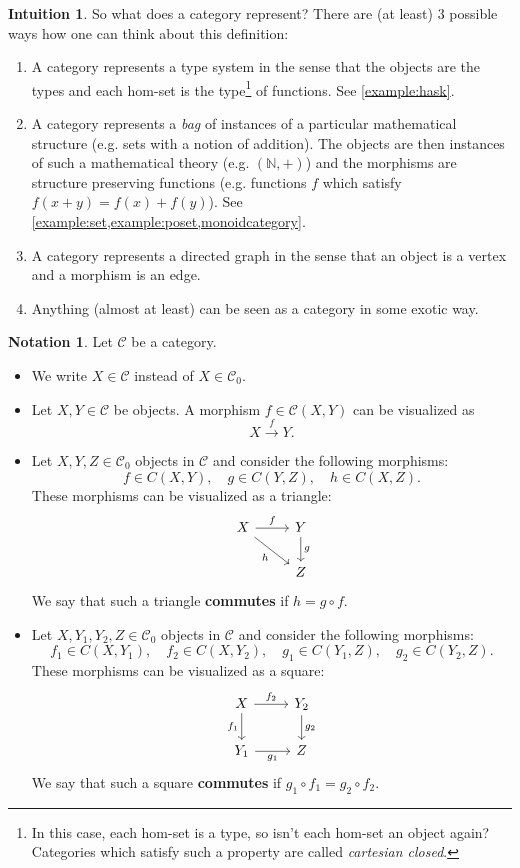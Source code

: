 \documentclass[a4paper,10pt]{scrartcl}
\theoremstyle{plain}
\theoremstyle{definition}
\newtheorem{intu}[thm]{Intuition}
\newtheorem{nota}[thm]{Notation}
\newcommand{\Cat}[1]{\mathcal{#1}}
\newcommand{\CC}{\Cat{C}}
\newcommand{\Ob}[1]{{#1}_0}
\newcommand{\CHom}[3]{{#1}(#2,#3)}
\newcommand{\co}[2]{\ensuremath{#2 \circ #1}}
\begin{document}
\begin{intu} So what does a category represent? There are (at least) $3$ possible ways how one can think about this definition:
\begin{enumerate}
\item A category represents a type system in the sense that the objects are the types and each hom-set is the type\footnote{In this case, each hom-set is a type, so isn't each hom-set an object again? Categories which satisfy such a property are called \textit{cartesian closed}.} of functions. See \cref{example:hask}.
\item A category represents a \textit{bag} of instances of a particular mathematical structure (e.g. sets with a notion of addition). The objects are then instances of such a mathematical theory (e.g. $(\mathbb{N},+)$) and the morphisms are structure preserving functions (e.g. functions $f$ which satisfy $f(x+y) = f(x) + f(y)$). See \cref{example:set,example:poset,monoidcategory}.
\item A category represents a directed graph in the sense that an object is a vertex and a morphism is an edge.
\item Anything (almost at least) can be seen as a category in some exotic way. 
\end{enumerate}
\end{intu}

\begin{nota} Let $\CC$ be a category.
\begin{itemize}
\item We write $X\in\CC$ instead of $X\in \Ob{\CC}$. 
\item Let $X,Y\in \CC$ be objects. A morphism $f\in\CHom{\CC}{X}{Y}$ can be visualized as \[ X \xrightarrow{f} Y. \]
\item Let $X,Y, Z \in \Ob{\CC}$ objects in $\CC$ and consider the following morphisms:
\[
f\in\CHom{C}{X}{Y}, \quad g\in\CHom{C}{Y}{Z}, \quad h\in\CHom{C}{X}{Z}.
\]
These morphisms can be visualized as a triangle:
\[
\begin{tikzcd}
X \arrow[r, "f"] \arrow[dr,swap, "h"] & Y \arrow[d, "g"] \\
& Z
\end{tikzcd}
\]
We say that such a triangle \textbf{commutes} if $h = \co{f}{g}$.
\item Let $X,Y_1,Y_2, Z \in \Ob{\CC}$ objects in $\CC$ and consider the following morphisms:
\[
f_1\in\CHom{C}{X}{Y_1}, \quad f_2\in\CHom{C}{X}{Y_2}, \quad g_1\in\CHom{C}{Y_1}{Z}, \quad g_2\in\CHom{C}{Y_2}{Z}.
\]
These morphisms can be visualized as a square:
\[
\begin{tikzcd}
X \arrow[r, "f_2"] \arrow[d,swap, "f_1"] & Y_2 \arrow[d, "g_2"] \\
Y_1 \arrow[r, swap, "g_1"] & Z 
\end{tikzcd}
\]
We say that such a square \textbf{commutes} if $\co{f_1}{g_1} = \co{f_2}{g_2}$.
\end{itemize}
\end{nota}
\end{document}
